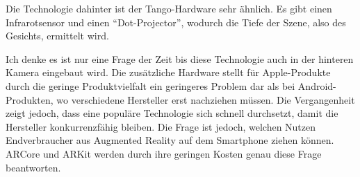 Die Technologie dahinter ist der Tango-Hardware sehr ähnlich. Es gibt einen Infrarotsensor und einen "`Dot-Projector"', wodurch die Tiefe der Szene, also des Gesichts, ermittelt wird. \cite{iphoneX_display}

Ich denke es ist nur eine Frage der Zeit bis diese Technologie auch in der hinteren Kamera eingebaut wird. Die zusätzliche Hardware stellt für Apple-Produkte durch die geringe Produktvielfalt ein geringeres Problem dar als bei Android-Produkten, wo verschiedene Hersteller erst nachziehen müssen. Die Vergangenheit zeigt jedoch, dass eine populäre Technologie sich schnell durchsetzt, damit die Hersteller konkurrenzfähig bleiben. Die Frage ist jedoch, welchen Nutzen Endverbraucher aus Augmented Reality auf dem Smartphone ziehen können. ARCore und ARKit werden durch ihre geringen Kosten genau diese Frage beantworten.